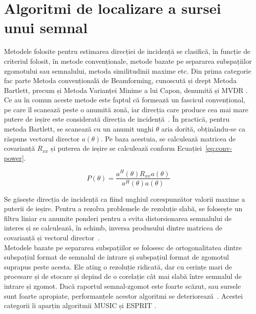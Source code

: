 \section{Algoritmi de localizare a sursei unui semnal}
\label{sec:localization-algo}

Metodele folosite pentru estimarea direcției de incidență se clasifică, în
funcție de criteriul folosit, în metode convenționale, metode bazate pe
separarea subspațiilor zgomotului sau semnalului, metoda similitudinii maxime
etc. Din prima categorie fac parte Metoda convențională de Beamforming,
cunoscută și drept Metoda Bartlett, precum și Metoda Varianței Minime a lui
Capon, denumită și MVDR .
Ce au în comun aceste metode este faptul că formează un fascicul convențional,
pe care îl scanează peste o anumită zonă, iar direcția care produce cea mai mare
putere de ieșire este considerată direcția de incidență~\cite{beamforming-doa}.
În practică, pentru metoda Bartlett, se scanează cu un anumit unghi $\theta$
aria dorită, obținându-se ca răspuns vectorul director $a(\theta)$. Pe baza
acestuia, se calculează matricea de covarianță $R_{xx}$ și puterea de ieșire se
calculează conform Ecuației~\eqref{eq:conv-power}.

\begin{equation}
\label{eq:conv-power}
    P(\theta) = \frac{a^H(\theta)R_{xx}a(\theta)}{a^H(\theta)a(\theta)}
\end{equation}

Se găsește direcția de incidență ca fiind unghiul corespunzător valorii maxime a
puterii de ieșire. Pentru a rezolva problemele de rezoluție slabă, se folosește
un filtru liniar cu anumite ponderi pentru a evita distorsionarea semnalului de
interes și se calculează, în schimb, inversa produsului dintre matricea de
covarianță și vectorul director~\cite{doa-smart-antenna}. \\

Metodele bazate pe separarea subspațiilor se folosesc de ortogonalitatea dintre
subspațiul format de semnalul de intrare și subspațiul format de zgomotul
suprapus peste acesta. Ele ating o rezoluție ridicată, dar cu cerințe mari de
procesare și de stocare și depind de o corelație cât mai slabă între semnalul de
intrare și zgomot. Dacă raportul semnal-zgomot este foarte scăzut, sau sursele
sunt foarte apropiate, performanțele acestor algoritmi se
deteriorează~\cite{subspace-performance}. Acestei categorii îi aparțin
algoritmii MUSIC  și ESPRIT
. \\

